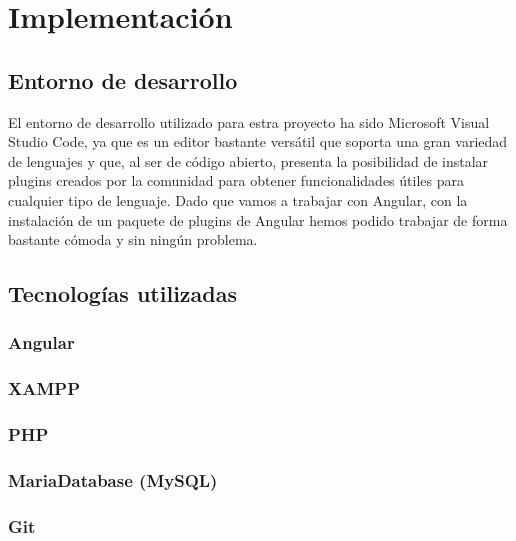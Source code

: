 \chapter{Implementaci\'on}\label{implementacion}

\section{Entorno de desarrollo}

El entorno de desarrollo utilizado para estra proyecto ha sido Microsoft Visual Studio Code, ya que es un editor bastante versátil que soporta una gran variedad de lenguajes y que, al ser de código abierto, presenta la posibilidad de instalar plugins creados por la comunidad para obtener funcionalidades útiles para cualquier tipo de lenguaje. Dado que vamos a trabajar con Angular, con la instalación de un paquete de plugins de Angular hemos podido trabajar de forma bastante cómoda y sin ningún problema.

\section{Tecnolog\'ias utilizadas}

\subsection{Angular}

\subsection{XAMPP}

\subsection{PHP}

\subsection{MariaDatabase (MySQL)}

\subsection{Git}

	